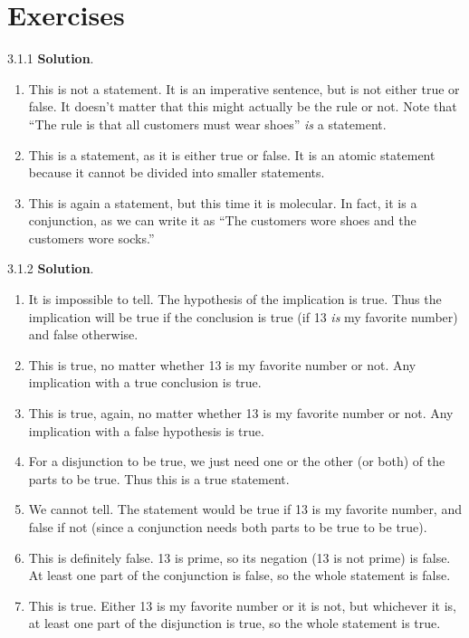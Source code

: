 \documentclass[11pt,]{book}
\theoremstyle{ptxplainnotitle}
\theoremstyle{ptxplaintitle}
\theoremstyle{ptxdefinitionnotitle}
\theoremstyle{ptxdefinitiontitle}
\theoremstyle{ptxdefinitionnotitle}
\theoremstyle{ptxdefinitiontitle}
\theoremstyle{ptxdefinitionnotitle}
\theoremstyle{ptxdefinitiontitle}
\theoremstyle{ptxdefinitiontitlenonumber}
\theoremstyle{ptxdefinitiontitlenonumber}
\numberwithin{equation}{chapter}
\begin{document}
\section*{Exercises}
\begin{divisionexercise}{3.1.1}
\textbf{Solution}.\quad%
\hypertarget{p-1795}{}%
\leavevmode%
\begin{enumerate}[label=\alph*.]
\item\hypertarget{li-773}{}\hypertarget{p-1796}{}%
This is not a statement.  It is an imperative sentence, but is not either true or false.  It doesn't matter that this might actually be the rule or not.  Note that ``The rule is that all customers must wear shoes'' \emph{is} a statement.%
\item\hypertarget{li-774}{}\hypertarget{p-1797}{}%
This is a statement, as it is either true or false.  It is an atomic statement because it cannot be divided into smaller statements.%
\item\hypertarget{li-775}{}\hypertarget{p-1798}{}%
This is again a statement, but this time it is molecular.  In fact, it is a conjunction, as we can write it as ``The customers wore shoes and the customers wore socks.''%
\end{enumerate}
%
\end{divisionexercise}%
\begin{divisionexercise}{3.1.2}
\textbf{Solution}.\quad%
\hypertarget{p-1851}{}%
\leavevmode%
\begin{enumerate}[label=\alph*.]
\item\hypertarget{li-825}{}\hypertarget{p-1852}{}%
It is impossible to tell.  The hypothesis of the implication is true.  Thus the implication will be true if the conclusion is true (if 13 \emph{is} my favorite number) and false otherwise.%
\item\hypertarget{li-826}{}\hypertarget{p-1853}{}%
This is true, no matter whether 13 is my favorite number or not.  Any implication with a true conclusion is true.%
\item\hypertarget{li-827}{}\hypertarget{p-1854}{}%
This is true, again, no matter whether 13 is my favorite number or not.  Any implication with a false hypothesis is true.%
\item\hypertarget{li-828}{}\hypertarget{p-1855}{}%
For a disjunction to be true, we just need one or the other (or both) of the parts to be true.  Thus this is a true statement.%
\item\hypertarget{li-829}{}\hypertarget{p-1856}{}%
We cannot tell.  The statement would be true if 13 is my favorite number, and false if not (since a conjunction needs both parts to be true to be true).%
\item\hypertarget{li-830}{}\hypertarget{p-1857}{}%
This is definitely false.  13 is prime, so its negation (13 is not prime) is false.  At least one part of the conjunction is false, so the whole statement is false.%
\item\hypertarget{li-831}{}\hypertarget{p-1858}{}%
This is true.  Either 13 is my favorite number or it is not, but whichever it is, at least one part of the disjunction is true, so the whole statement is true.%
\end{enumerate}
%
\end{divisionexercise}%
\end{document}
